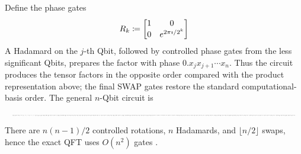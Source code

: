 Define the phase gates
\begin{equation}\label{eq:qft-phase-gates}
R_k
\coloneqq
\begin{bmatrix}
1&0\\
0&e^{2\pi\imath/2^k}
\end{bmatrix}
\end{equation}
A Hadamard on the $j$-th Qbit, followed by controlled phase gates from the less significant Qbits, prepares the factor with phase
\(
0.x_jx_{j+1}\cdots x_n
\).
Thus the circuit produces the tensor factors in the opposite order compared with the product representation above; the final SWAP gates restore the standard computational-basis order.
The general \(n\)-Qbit circuit is
\[
\resizebox{\textwidth}{!}{%
\begin{quantikz}[
  column sep=0.42cm,
  row sep=0.30cm,
  wire types={q,q,n,q,q}
]
  &
   \gate{H}
  & \gate{R_2}
  & \ \ldots \
  & \gate{R_{n-1}}
  & \gate{R_n}
  & \qw
  & \qw
  & \qw
  & \qw
  & \qw
  & \qw
  & \qw
  & \qw
  & \swap{4}
  & \qw \\
  &
   \qw
  & \ctrl{-1}
  & \ \ldots \
  & \qw
  & \qw
  & \gate{H}
  & \ \ldots \
  & \gate{R_{n-2}}
  & \gate{R_{n-1}}
  & \qw
  & \qw
  & \qw
  & \qw
  & \swap{2}
  & \qw \\
  &
   \vdots
  & 
  & \ddots
  & 
  & 
  &
  & \ddots
  & 
  & 
  & \ddots
  & 
  &
  & \vdots
  &
  & \\
  &
   \qw
  & \qw
  & \ \ldots \
  & \ctrl{-3}
  & \qw
  & \qw
  & \ \ldots \
  & \ctrl{-2}
  & \qw
  & \ \ldots \
  & \gate{H}
  & \gate{R_2}
  & \qw
  & \targX{}
  & \qw \\
  &
   \qw
  & \qw
  & \ \ldots \
  & \qw
  & \ctrl{-4}
  & \qw
  & \ \ldots \
  & \qw
  & \ctrl{-3}
  & \ \ldots \
  & \qw
  & \ctrl{-1}
  & \gate{H}
  & \targX{}
  & \qw
\end{quantikz}
}
\]
There are
\(
n(n-1)/2
\)
controlled rotations, \(n\) Hadamards, and
\(
\lfloor n/2\rfloor
\)
swaps, hence the exact QFT uses
\(
O(n^2)
\)
gates \cite{wikipediaQFTGateCount}.

